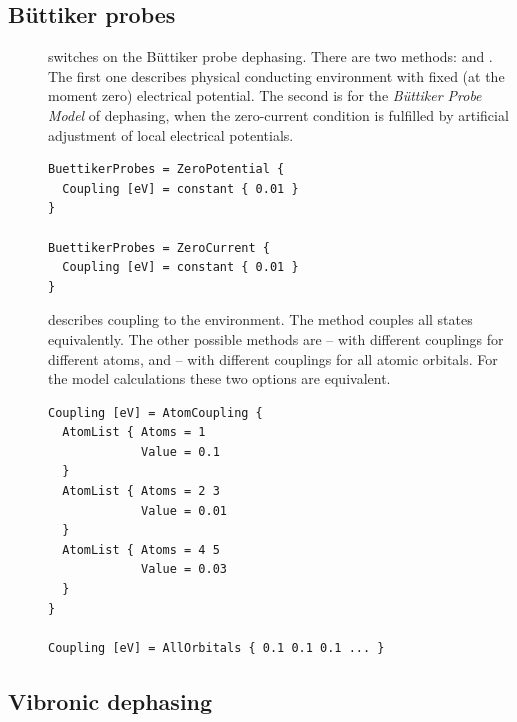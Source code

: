 {\begin{ptableh}
  \hline
\end{ptableh}

\subsection{B\"uttiker probes}

\begin{description}
  
\item[] switches on the B\"uttiker probe dephasing. There are two methods:  and . The first one describes physical conducting environment with fixed (at the moment zero) electrical potential. The second is for the {\it B\"uttiker Probe Model} of dephasing, when the zero-current condition is fulfilled by artificial adjustment of local electrical potentials.

\begin{verbatim}   
BuettikerProbes = ZeroPotential {
  Coupling [eV] = constant { 0.01 }
}

BuettikerProbes = ZeroCurrent {
  Coupling [eV] = constant { 0.01 }
}
\end{verbatim}

\end{description}  

\begin{description}
\item[] describes coupling to the environment. The method  couples all states equivalently. The other possible methods are  -- with different couplings for different atoms, and  -- with different couplings for all atomic orbitals. For the model calculations these two options are equivalent. 

\begin{verbatim}   
Coupling [eV] = AtomCoupling {
  AtomList { Atoms = 1
             Value = 0.1
  }
  AtomList { Atoms = 2 3
             Value = 0.01
  }
  AtomList { Atoms = 4 5
             Value = 0.03
  }
}

Coupling [eV] = AllOrbitals { 0.1 0.1 0.1 ... }
\end{verbatim}

\end{description}  
  
\subsection{Vibronic dephasing}

}
